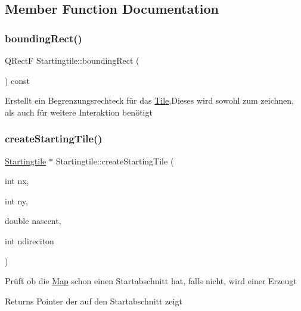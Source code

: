 \subsection{Member Function Documentation}
\mbox{\label{class_startingtile_adfdbbb769775bf4a71f42795a3ca5cc7}} 
\subsubsection{\texorpdfstring{bounding\+Rect()}{boundingRect()}}
{\footnotesize\ttfamily Q\+RectF Startingtile\+::bounding\+Rect (\begin{DoxyParamCaption}{ }\end{DoxyParamCaption}) const\hspace{0.3cm}{\ttfamily [virtual]}}

Erstellt ein Begrenzungsrechteck für das \mbox{\hyperlink{class_tile}{Tile}},Dieses wird sowohl zum zeichnen, als auch für weitere Interaktion benötigt \mbox{\label{class_startingtile_a802644c93a230d81ba5a21c87866a411}} 
\subsubsection{\texorpdfstring{create\+Starting\+Tile()}{createStartingTile()}}
{\footnotesize\ttfamily \mbox{\hyperlink{class_startingtile}{Startingtile}} $\ast$ Startingtile\+::create\+Starting\+Tile (\begin{DoxyParamCaption}\item[{int}]{nx,  }\item[{int}]{ny,  }\item[{double}]{nascent,  }\item[{int}]{ndireciton }\end{DoxyParamCaption})\hspace{0.3cm}{\ttfamily [static]}}

Prüft ob die \mbox{\hyperlink{class_map}{Map}} schon einen Startabschnitt hat, falls nicht, wird einer Erzeugt \begin{DoxyReturn}{Returns}
Pointer der auf den Startabschnitt zeigt 
\end{DoxyReturn}
\mbox{\label{class_startingtile_af9014bd47962800743b2057b520546d7}} 
